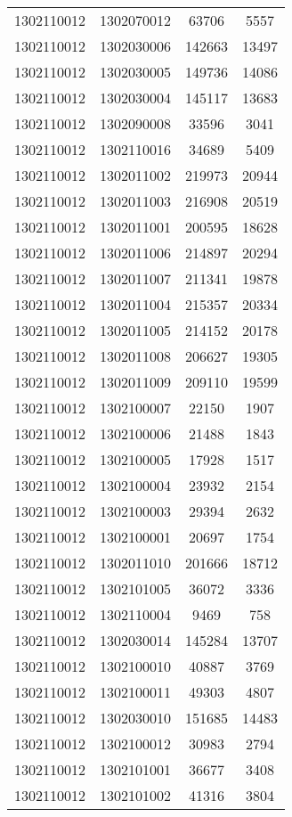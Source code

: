 \begin{longtable}[h]{llcc}
		1302110012 & 1302070012 & 63706 & 5557\\
		1302110012 & 1302030006 & 142663 & 13497\\
		1302110012 & 1302030005 & 149736 & 14086\\
		1302110012 & 1302030004 & 145117 & 13683\\
		1302110012 & 1302090008 & 33596 & 3041\\
		1302110012 & 1302110016 & 34689 & 5409\\
		1302110012 & 1302011002 & 219973 & 20944\\
		1302110012 & 1302011003 & 216908 & 20519\\
		1302110012 & 1302011001 & 200595 & 18628\\
		1302110012 & 1302011006 & 214897 & 20294\\
		1302110012 & 1302011007 & 211341 & 19878\\
		1302110012 & 1302011004 & 215357 & 20334\\
		1302110012 & 1302011005 & 214152 & 20178\\
		1302110012 & 1302011008 & 206627 & 19305\\
		1302110012 & 1302011009 & 209110 & 19599\\
		1302110012 & 1302100007 & 22150 & 1907\\
		1302110012 & 1302100006 & 21488 & 1843\\
		1302110012 & 1302100005 & 17928 & 1517\\
		1302110012 & 1302100004 & 23932 & 2154\\
		1302110012 & 1302100003 & 29394 & 2632\\
		1302110012 & 1302100001 & 20697 & 1754\\
		1302110012 & 1302011010 & 201666 & 18712\\
		1302110012 & 1302101005 & 36072 & 3336\\
		1302110012 & 1302110004 & 9469 & 758\\
		1302110012 & 1302030014 & 145284 & 13707\\
		1302110012 & 1302100010 & 40887 & 3769\\
		1302110012 & 1302100011 & 49303 & 4807\\
		1302110012 & 1302030010 & 151685 & 14483\\
		1302110012 & 1302100012 & 30983 & 2794\\
		1302110012 & 1302101001 & 36677 & 3408\\
		1302110012 & 1302101002 & 41316 & 3804\\

\end{longtable}
